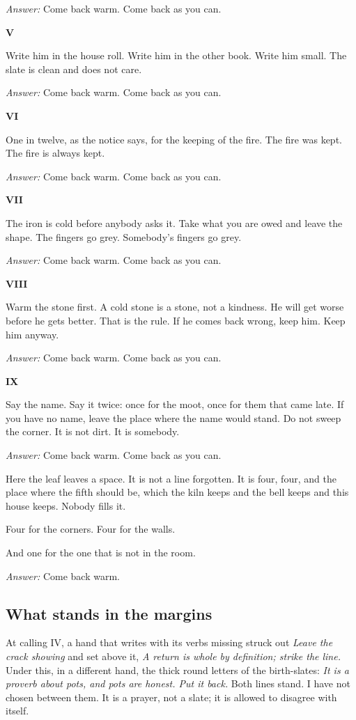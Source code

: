 \documentclass{design/chronicle}
\begin{document}
\emph{Answer:} Come back warm. Come back as you can.

\textbf{V}

Write him in the house roll. Write him in the other book. Write him small. The slate is clean and does not care.

\emph{Answer:} Come back warm. Come back as you can.

\textbf{VI}

One in twelve, as the notice says, for the keeping of the fire. The fire was kept. The fire is always kept.

\emph{Answer:} Come back warm. Come back as you can.

\textbf{VII}

The iron is cold before anybody asks it. Take what you are owed and leave the shape. The fingers go grey. Somebody’s fingers go grey.

\emph{Answer:} Come back warm. Come back as you can.

\textbf{VIII}

Warm the stone first. A cold stone is a stone, not a kindness. He will get worse before he gets better. That is the rule. If he comes back wrong, keep him. Keep him anyway.

\emph{Answer:} Come back warm. Come back as you can.

\textbf{IX}

Say the name. Say it twice: once for the moot, once for them that came late. If you have no name, leave the place where the name would stand. Do not sweep the corner. It is not dirt. It is somebody.

\emph{Answer:} Come back warm. Come back as you can.

Here the leaf leaves a space. It is not a line forgotten. It is four, four, and the place where the fifth should be, which the kiln keeps and the bell keeps and this house keeps. Nobody fills it.

Four for the corners. Four for the walls.

And one for the one that is not in the room.

\emph{Answer:} Come back warm.

\subsection*{What stands in the margins}

At calling IV, a hand that writes with its verbs missing struck out \emph{Leave the crack showing} and set above it, \emph{A return is whole by definition; strike the line.} Under this, in a different hand, the thick round letters of the birth-slates: \emph{It is a proverb about pots, and pots are honest. Put it back.} Both lines stand. I have not chosen between them. It is a prayer, not a slate; it is allowed to disagree with itself.
\end{document}
